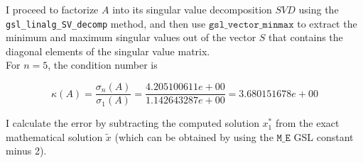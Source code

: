 \documentclass{article}
\newcommand{\code}{\texttt}
\begin{document}
I proceed to factorize $A$ into its singular value decomposition $SVD$ using the \code{gsl\_linalg\_SV\_decomp} method, and then use $\code{gsl\_vector\_minmax}$ to extract the minimum and maximum singular values out of the vector $S$ that contains the diagonal elements of the singular value matrix. \\

For $n=5$, the condition number is

$$\kappa(A) = \frac{\sigma_n (A)}{\sigma_1 (A)}= \frac{4.205100611e+00}{1.142643287e+00}=3.680151678e+00$$

I calculate the error by subtracting the computed solution $x_{1}^{\ast}$ from the exact mathematical solution $\widetilde{x}$ (which can be obtained by using the $\code{M\_E}$ GSL constant minus 2).\\
\end{document}
